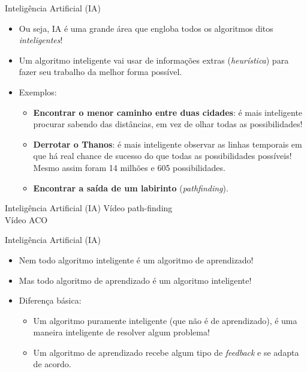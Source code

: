 \documentclass{libs/ufc_format}
\begin{document}
\begin{frame}{Inteligência Artificial (IA)}
    \begin{itemize}
        \justifying
        \item Ou seja, IA é uma grande área que engloba todos os algoritmos ditos \emph{inteligentes}!
        \item<2-> Um algoritmo inteligente vai usar de informações extras (\textit{heurística}) para fazer seu trabalho da melhor forma possível.
        \item<3-> Exemplos:
        \begin{itemize}
            \justifying
            \item<4-> \textbf{Encontrar o menor caminho entre duas cidades}: é mais inteligente procurar sabendo das distâncias, em vez de olhar todas as possibilidades!
            \item<5-> \textbf{Derrotar o Thanos}: é mais inteligente observar as linhas temporais em que há real chance de sucesso do que todas as possibilidades possíveis! Mesmo assim foram 14 milhões e 605 possibilidades.
            \item<6-> \textbf{Encontrar a saída de um labirinto} (\textit{pathfinding}).
        \end{itemize}
    \end{itemize}
\end{frame}

\begin{frame}{Inteligência Artificial (IA)}
    \centering
    Vídeo path-finding \cite{s14}\\
    Vídeo ACO \cite{t21}
\end{frame}

\begin{frame}{Inteligência Artificial (IA)}
    \begin{itemize}
        \justifying
        \item<1> Nem todo algoritmo inteligente é um algoritmo de aprendizado!
        \item<1> Mas todo algoritmo de aprendizado é um algoritmo inteligente!
        \item<2-> Diferença básica:
        \begin{itemize}
            \justifying
            \item<2-> Um algoritmo puramente inteligente (que não é de aprendizado), é uma maneira inteligente de resolver algum problema!
            \item<2-> Um algoritmo de aprendizado recebe algum tipo de \textit{feedback} e se adapta de acordo.
        \end{itemize}
    \end{itemize}
\end{frame}
\end{document}
